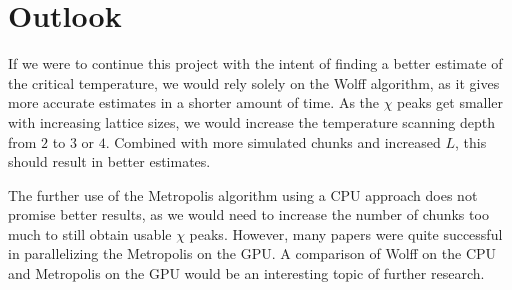 	\section{Outlook}
		If we were to continue this project with the intent of finding a better estimate of the critical temperature, we would rely solely on the Wolff algorithm, as it gives more accurate estimates in a shorter amount of time. As the $\chi$ peaks get smaller with increasing lattice sizes, we would increase the temperature scanning depth from $2$ to $3$ or $4$. Combined with more simulated chunks and increased $L$, this should result in better estimates.
		
		The further use of the Metropolis algorithm using a CPU approach does not promise better results, as we would need to increase the number of chunks too much to still obtain usable $\chi$ peaks. However, many papers \citep*{literature_gpu} were quite successful in parallelizing the Metropolis on the GPU. A comparison of Wolff on the CPU and Metropolis on the GPU would be an interesting topic of further research.
		